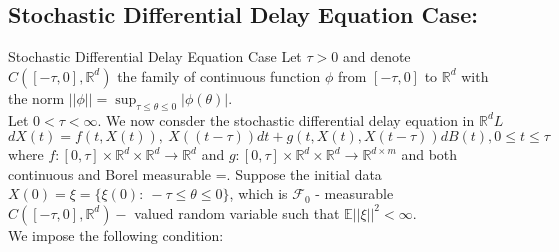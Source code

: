 \documentclass[unknownkeysallowed, compress]{beamer}
\theoremstyle{plain}
\begin{document}
\subsection{Stochastic Differential Delay Equation Case:}
\begin{frame}[allowframbreaks]{Stochastic Differential Delay Equation Case}
Let $\tau>0$ and denote $C([-\tau,0],\mathbb{R}^d)$ the family of continuous function $\phi$ from $[-\tau,0]$ to $\mathbb{R}^d$ with the norm $||\phi|| = \sup_{\tau\leq \theta\leq 0}|\phi(\theta)|$.\\
Let $0<\tau<\infty$. We now consder the stochastic differential delay equation in $\mathbb{R}^dL$
\begin{equation}\label{3.1.5}
dX(t) = f(t,X(t)),~X((t-\tau))dt+g(t,X(t), X(t-\tau))dB(t), 0\leq t\leq \tau
\end{equation}
where $f:[0,\tau]\times \mathbb{R}^d\times\mathbb{R}^d\rightarrow \mathbb{R}^d$ and $g:[0,\tau]\times\mathbb{R}^d\times \mathbb{R}^d\rightarrow \mathbb{R}^{d\times m}$ and both continuous and Borel measurable =. Suppose the initial data $X(0) = \xi = \{\xi(0):~-\tau\leq \theta\leq 0\}$, which is $\mathcal{F}_0$ - measurable $C([-\tau,0],\mathbb{R}^d) -$ valued random variable such that $\mathbb{E}||\xi||^2<\infty$.\\
We impose the following condition:
\end{frame}
\end{document}
